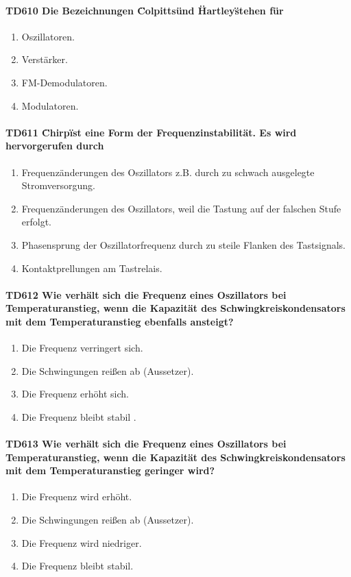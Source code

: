\documentclass[8pt]{article}
\begin{document}
\begin{enumerate}
\begin{enumerate}[nolistsep,label=\Alph*]
\paragraph*{TD610 Die Bezeichnungen \"Colpitts\" und \"Hartley\" stehen für}
\begin{enumerate}[nolistsep,label=\Alph*]
\item Oszillatoren.
\item Verstärker.
\item FM-Demodulatoren.
\item Modulatoren.
\end{enumerate}

\paragraph*{TD611 \"Chirp\" ist eine Form der Frequenzinstabilität. Es wird hervorgerufen durch}
\begin{enumerate}[nolistsep,label=\Alph*]
\item Frequenzänderungen des Oszillators z.B. durch zu schwach ausgelegte Stromversorgung.
\item Frequenzänderungen des Oszillators, weil die Tastung auf der falschen Stufe erfolgt.
\item Phasensprung der Oszillatorfrequenz durch zu steile Flanken des Tastsignals.
\item Kontaktprellungen am Tastrelais.
\end{enumerate}

\paragraph*{TD612 Wie verhält sich die Frequenz eines Oszillators bei Temperaturanstieg, wenn die Kapazität des Schwingkreiskondensators mit dem Temperaturanstieg ebenfalls ansteigt?}
\begin{enumerate}[nolistsep,label=\Alph*]
\item Die Frequenz verringert sich.
\item Die Schwingungen reißen ab (Aussetzer).
\item Die Frequenz erhöht sich.
\item Die Frequenz bleibt stabil .
\end{enumerate}

\paragraph*{TD613 Wie verhält sich die Frequenz eines Oszillators bei Temperaturanstieg, wenn die Kapazität des Schwingkreiskondensators mit dem Temperaturanstieg geringer wird?}
\begin{enumerate}[nolistsep,label=\Alph*]
\item Die Frequenz wird erhöht.
\item Die Schwingungen reißen ab (Aussetzer).
\item Die Frequenz wird niedriger.
\item Die Frequenz bleibt stabil.
\end{enumerate}


\end{enumerate}
\end{enumerate}
\end{document}
